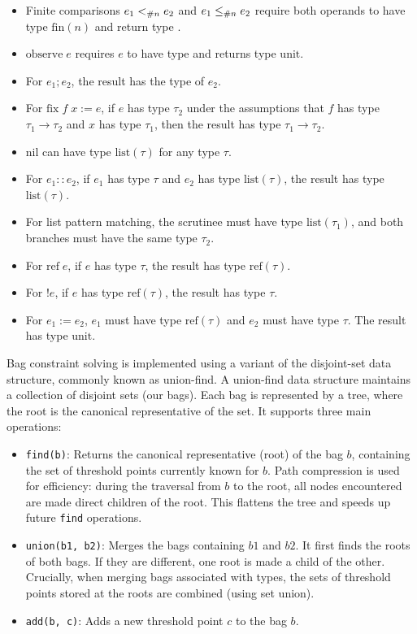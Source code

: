 \begin{itemize}
    \item Finite comparisons $e_1 <_{\#{n}} e_2$ and $e_1 \leq_{\#{n}} e_2$ require both operands to have type $\text{fin}(n)$ and return type \bool.
    \item $\text{observe}\; e$ requires $e$ to have type \bool{} and returns type $\text{unit}$.
    \item For $e_1; e_2$, the result has the type of $e_2$.
    \item For $\text{fix}\; f\; x := e$, if $e$ has type $\tau_2$ under the assumptions that $f$ has type $\tau_1 \rightarrow \tau_2$ and $x$ has type $\tau_1$, then the result has type $\tau_1 \rightarrow \tau_2$.
    \item $\text{nil}$ can have type $\text{list}(\tau)$ for any type $\tau$.
    \item For $e_1 :: e_2$, if $e_1$ has type $\tau$ and $e_2$ has type $\text{list}(\tau)$, the result has type $\text{list}(\tau)$.
    \item For list pattern matching, the scrutinee must have type $\text{list}(\tau_1)$, and both branches must have the same type $\tau_2$.
    \item For $\text{ref}\; e$, if $e$ has type $\tau$, the result has type $\text{ref}(\tau)$.
    \item For $!e$, if $e$ has type $\text{ref}(\tau)$, the result has type $\tau$.
    \item For $e_1 := e_2$, $e_1$ must have type $\text{ref}(\tau)$ and $e_2$ must have type $\tau$. The result has type $\text{unit}$.
\end{itemize}

Bag constraint solving is implemented using a variant of the disjoint-set data structure, commonly known as union-find.
A union-find data structure maintains a collection of disjoint sets (our bags). Each bag is represented by a tree, where the root is the canonical representative of the set. It supports three main operations:
\begin{itemize}
    \item \texttt{find(b)}: Returns the canonical representative (root) of the bag $b$, containing the set of threshold points currently known for $b$. Path compression is used for efficiency: during the traversal from $b$ to the root, all nodes encountered are made direct children of the root. This flattens the tree and speeds up future \texttt{find} operations.
    \item \texttt{union(b1, b2)}: Merges the bags containing $b1$ and $b2$. It first finds the roots of both bags. If they are different, one root is made a child of the other. Crucially, when merging bags associated with \float{} types, the sets of threshold points stored at the roots are combined (using set union).
    \item \texttt{add(b, c)}: Adds a new threshold point $c$ to the bag $b$.
\end{itemize}

